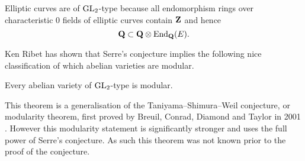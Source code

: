 \documentclass[a4paper,12pt]{article}
\begin{document}
\begin{ex}
Elliptic curves are of $\operatorname{GL}_2$-type because all endomorphism rings over characteristic 0 fields of elliptic curves contain $\mathbf{Z}$ and hence
\[
\mathbf{Q} \subset \mathbf{Q} \otimes \operatorname{End}_{\mathbf{Q}}(E).
\]
\end{ex}

Ken Ribet has shown \cite{Ribet04} that Serre's conjecture implies the following nice classification of which abelian varieties are modular.

\begin{thm}
Every abelian variety of $\operatorname{GL}_2$-type is modular.
\end{thm}

This theorem is a generalisation of the Taniyama--Shimura--Weil conjecture, or modularity theorem, first proved by Breuil, Conrad, Diamond and Taylor in 2001 \cite{BCDT}.
However this modularity statement is significantly stronger and uses the full power of Serre's conjecture.
As such this theorem was not known prior to the proof of the conjecture.




\end{document}
